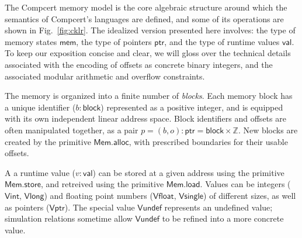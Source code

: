 \documentclass[acmsmall,anonymous]{acmart}
\newcommand{\kw}[1]{\ensuremath{ \textsf{#1} }}
\begin{document}
The Compcert memory model \citep{compcertmmv2}
is the core algebraic structure
around which the semantics of Compcert's languages
are defined,
and some of its operations
are shown in Fig.~\ref{fig:cklr}.
The idealized version presented here
involves:
the type of memory states \kw{mem},
the type of pointers \kw{ptr}, and
the type of runtime values \kw{val}.
To keep our exposition concise and clear,
we will gloss over the technical details
associated with the encoding of offsets
as concrete binary integers,
and the associated modular arithmetic and overflow constraints.

The memory is organized into a finite number of \emph{blocks}.
Each memory block has a unique identifier ($b : \kw{block}$)
represented as a positive integer,
and is equipped with its own independent linear address space.
Block identifiers and offsets are often manipulated together,
as a pair $p = (b, o) : \kw{ptr} = \kw{block} \times \mathbb{Z}$.
New blocks are created by the primitive $\kw{Mem.alloc}$,
with prescribed boundaries for their usable offsets.

A a runtime value ($v : \kw{val}$) can be stored at
a given address using the primitive \kw{Mem.store},
and retreived using the primitive \kw{Mem.load}.
Values can be integers (\kw{Vint}, \kw{Vlong}) and
floating point numbers (\kw{Vfloat}, \kw{Vsingle})
of different sizes,
as well as pointers (\kw{Vptr}).
The special value \kw{Vundef}
represents an undefined value;
simulation relations sometime allow $\kw{Vundef}$
to be refined into a more concrete value.
\end{document}
